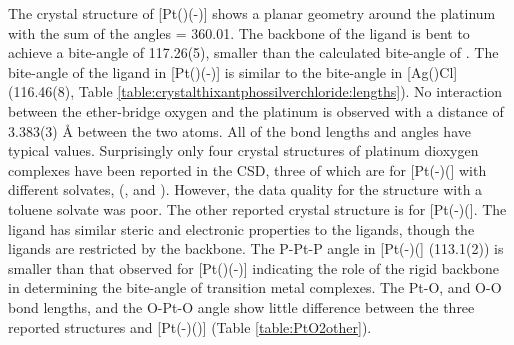 The crystal structure of [Pt(\tButhixantphos)(\hapto{}-)] shows a planar geometry around the platinum with the sum of the angles = 360.01\degrees{}.  The backbone of the ligand is bent to achieve a bite-angle of 117.26(5)\degrees, smaller than the calculated bite-angle of \fixme{126.98\degrees}.  The bite-angle of the \tButhixantphos{} ligand in [Pt(\tButhixantphos)(\hapto{}-)] is similar to the bite-angle in [Ag(\tButhixantphos)Cl] (116.46(8)\degrees, Table \ref{table:crystalthixantphossilverchloride:lengths}).  No interaction between the ether-bridge oxygen and the platinum is observed with a distance of 3.383(3) \si{\angstrom} between the two atoms.  All of the bond lengths and angles have typical values.  Surprisingly only four crystal structures of platinum dioxygen complexes have been reported in the \gls{CSD}, three of which are for [Pt(-)(] with different solvates, (,  and )\cite{Kashiwagi1969, Cheng1971, Cook1969}.  However, the data quality for the structure with a toluene solvate was poor.\cite{Cook1969}  The other reported crystal structure is for [Pt(-)(]\cite{Yoshida1979}.  The  ligand has similar steric and electronic properties to the \tBuxantphos{} ligands, though the \tBuxantphos{} ligands are restricted by the backbone.  The P-Pt-P angle in [Pt(-)(] (113.1(2)\degrees) is smaller than that observed for [Pt(\tButhixantphos)(\hapto{}-)] indicating the role of the rigid backbone in determining the bite-angle of transition metal complexes.  The Pt-O, and O-O bond lengths, and the O-Pt-O angle show little difference between the three reported structures and [Pt(-)(\tButhixantphos)] (Table \ref{table:PtO2other}).


